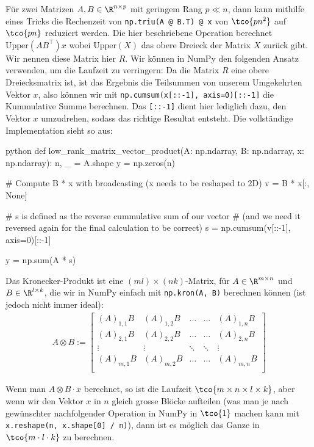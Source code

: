 \inlineex Für zwei Matrizen $A, B \in \R^{n \times p}$ mit geringem Rang $p \ll n$, dann kann mithilfe eines Tricks die Rechenzeit von \verb|np.triu(A @ B.T) @ x| von $\tco{pn^2}$ auf $\tco{pn}$ reduziert werden.
Die hier beschriebene Operation berechnet $\text{Upper}(AB^\top) x$ wobei $\text{Upper}(X)$ das obere Dreieck der Matrix $X$ zurück gibt.
Wir nennen diese Matrix hier $R$.
Wir können in NumPy den folgenden Ansatz verwenden, um die Laufzeit zu verringern:
Da die Matrix $R$ eine obere Dreiecksmatrix ist, ist das Ergebnis die Teilsummen von unserem Umgekehrten Vektor $x$, also können wir mit \verb|np.cumsum(x[::-1], axis=0)[::-1]| die Kummulative Summe berechnen.
Das \verb|[::-1]| dient hier lediglich dazu, den Vektor $x$ umzudrehen, sodass das richtige Resultat entsteht.
Die vollständige Implementation sieht so aus:
\begin{code}{python}
    def low_rank_matrix_vector_product(A: np.ndarray, B: np.ndarray, x: np.ndarray):
        n, _ = A.shape
        y = np.zeros(n)

        # Compute B * x with broadcasting (x needs to be reshaped to 2D)
        v = B * x[:, None]

        # s is defined as the reverse cummulative sum of our vector
        # (and we need it reversed again for the final calculation to be correct)
        s = np.cumsum(v[::-1], axis=0)[::-1]

        y = np.sum(A * s)
\end{code}


\setcounter{all}{21}
 Das Kronecker-Produkt ist eine $(ml) \times (nk)$-Matrix, für $A \in \R^{m \times n}$ und $B \in \R^{l \times k}$, die wir in NumPy einfach mit \verb|np.kron(A, B)| berechnen können (ist jedoch nicht immer ideal):
\begin{align*}
    A \otimes B :=
    \begin{bmatrix}
        (A)_{1, 1} B & (A)_{1, 2}B & \ldots & \ldots & (A)_{1, n} B \\
        (A)_{2, 1} B & (A)_{2, 2}B & \ldots & \ldots & (A)_{2, n} B \\
        \vdots       & \vdots      & \ddots & \ddots & \vdots       \\
        (A)_{m, 1} B & (A)_{m, 2}B & \ldots & \ldots & (A)_{m, n} B \\
    \end{bmatrix}
\end{align*}

 Wenn man $A \otimes B \cdot x$ berechnet, so ist die Laufzeit $\tco{m \times n \times l \times k}$, aber wenn wir den Vektor $x$ in $n$ gleich grosse Blöcke aufteilen (was man je nach gewünschter nachfolgender Operation in NumPy in $\tco{1}$ machen kann mit \verb|x.reshape(n, x.shape[0] / n)|), dann ist es möglich das Ganze in $\tco{m \cdot l \cdot k}$ zu berechnen. 

